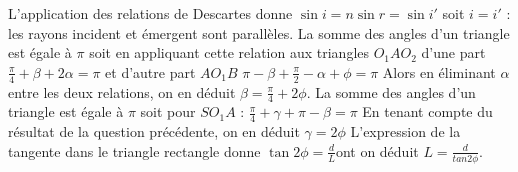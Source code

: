 \begin{Answer}
\Question L’application des relations de Descartes donne $\sin i = n \sin r = \sin i'$ soit $i = i'$ : les rayons incident et émergent sont parallèles.
\Question La somme des angles d’un triangle est égale à $\pi$ soit en appliquant cette relation aux triangles $O_1 AO_2$ d’une part $\frac{\pi}{4}+\beta+2\alpha = \pi$ et d’autre part $AO_1B$  $\pi-\beta +\frac{\pi}{2}-\alpha+\phi=\pi$ Alors en éliminant $\alpha$ entre les deux relations, on en déduit $\beta = \frac{\pi}{4} +2\phi$.
\Question La somme des angles d’un triangle est égale à $\pi$ soit pour $SO_1A$ : $\frac{\pi}{4}+\gamma+\pi-\beta = \pi$ En tenant compte du résultat de la question précédente, on en déduit $\gamma =2\phi$
\Question L’expression de la tangente dans le triangle rectangle donne $\tan 2\phi = \frac{d}{L}$ont on déduit $L=\frac{d}{tan 2\phi}$.
\end{Answer}
